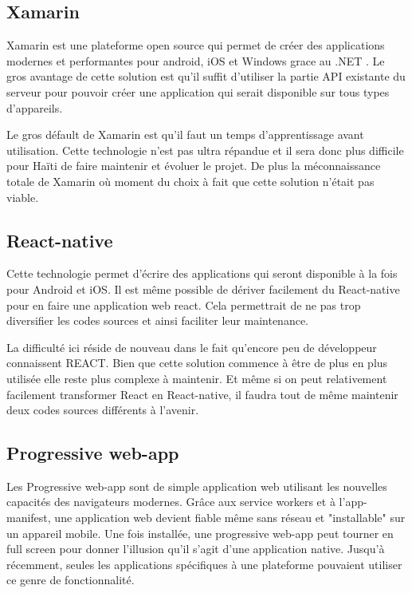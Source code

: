 \documentclass{EPL-master-thesis-covers-FR}
\begin{document}
			\subsection*{Xamarin}
				Xamarin est une plateforme open source qui permet de créer des applications modernes et performantes pour android, iOS et Windows grace au .NET \cite{ref:xamarin}. Le gros avantage de cette solution est qu'il suffit d'utiliser la partie API existante du serveur pour pouvoir créer une application qui serait disponible sur tous types d'appareils.
			
				Le gros défault de Xamarin est qu'il faut un temps d'apprentissage avant utilisation. Cette technologie n'est pas ultra répandue et il sera donc plus difficile pour Haïti de faire maintenir et évoluer le projet. De plus la méconnaissance totale de Xamarin où moment du choix à fait que cette solution n'était pas viable.
				
			\subsection*{React-native}
				Cette technologie permet d'écrire des applications qui seront disponible à la fois pour Android et iOS. Il est même possible de dériver facilement du React-native pour en faire une application web react. Cela permettrait de ne pas trop diversifier les codes sources et ainsi faciliter leur maintenance.
				
				La difficulté ici réside de nouveau dans le fait qu'encore peu de développeur connaissent REACT. Bien que cette solution commence à être de plus en plus utilisée elle reste plus complexe à maintenir. Et même si on peut relativement facilement transformer React en React-native, il faudra tout de même maintenir deux codes sources différents à l'avenir.
				
			\subsection*{Progressive web-app}
				Les Progressive web-app sont de simple application web utilisant les nouvelles capacités des navigateurs modernes. Grâce aux service workers et à l'app-manifest, une application web devient fiable même sans réseau et "installable" sur un appareil mobile. Une fois installée, une progressive web-app peut tourner en full screen pour donner l'illusion qu'il s'agit d'une application native. Jusqu'à récemment, seules les applications spécifiques à une plateforme pouvaient utiliser ce genre de fonctionnalité. 
				
\end{document}
